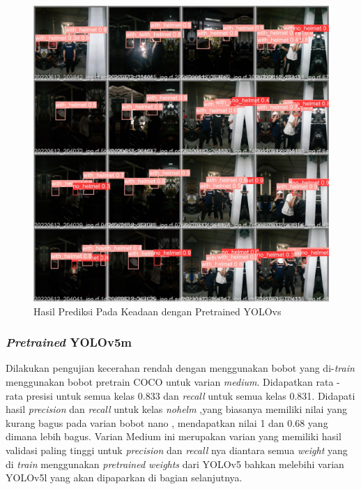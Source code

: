 \begin{figure}[ht]
  \centering
  \includegraphics[scale=0.2]{gambar/train_v2_val/low_ligjt/yolosmall/low_light_val_batch0_pred.jpg}
  \caption{Hasil Prediksi Pada Keadaan dengan Pretrained YOLOvs}
\end{figure}

\newpage

\subsubsection{\emph{Pretrained} YOLOv5m}
\label{subsubsec:lowlight_yolov5m}

\par Dilakukan pengujian kecerahan rendah dengan menggunakan bobot yang di-\emph{train} menggunakan bobot
pretrain COCO untuk varian \emph{medium}. Didapatkan rata - rata presisi untuk semua kelas 0.833 dan \emph{recall} untuk semua
kelas 0.831. Didapati hasil \emph{precision} dan \emph{recall} untuk kelas \emph{no\textunderscore helm} ,yang biasanya
memiliki nilai yang kurang bagus pada varian bobot nano , mendapatkan nilai 1 dan 0.68 yang dimana lebih bagus. 
Varian Medium ini merupakan varian yang memiliki hasil validasi paling tinggi untuk \emph{precision} dan \emph{recall} nya diantara semua \emph{weight}
yang di \emph{train} menggunakan \emph{pretrained weights} dari YOLOv5 bahkan melebihi varian YOLOv5l yang akan dipaparkan di bagian selanjutnya.

